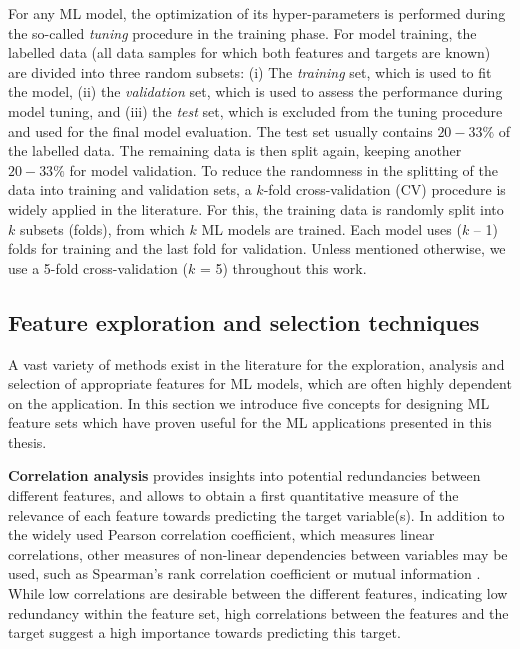 For any ML model, the optimization of its hyper-parameters is performed during the so-called \textit{tuning} procedure in the training phase. For model training, the labelled data (all data samples for which both features and targets are known) are divided into three random subsets: 
(i) The \textit{training} set, which is used to fit the model, (ii) the \textit{validation} set, which is used to assess the performance during model tuning, and (iii) the \textit{test} set, which is excluded from the tuning procedure and used for the final model evaluation.
The test set usually contains $20 - 33\%$ of the labelled data. The remaining data is then split again, keeping another $20 - 33\%$ for model validation.
To reduce the randomness in the splitting of the data into training and validation sets, a $k$-fold cross-validation (CV) procedure is widely applied in the literature. 
For this, the training data is randomly split into $k$ subsets (folds), from which $k$ ML models are trained. Each model uses ($k$ – 1) folds for training and the last fold for validation. 
Unless mentioned otherwise, we use a 5-fold cross-validation ($k$ = 5) throughout this work.
% 

\subsection{Feature exploration and selection techniques}
\label{ML_features}

A vast variety of methods exist in the literature for the exploration, analysis and selection of appropriate features for ML models, which are often highly dependent on the application. In this section we introduce five concepts for designing ML feature sets which have proven useful for the ML applications presented in this thesis.

\textbf{Correlation analysis} provides insights into potential redundancies between different features, and allows to obtain a first quantitative measure of the relevance of each feature towards predicting the target variable(s).
In addition to the widely used Pearson correlation coefficient, which measures linear correlations, other measures of non-linear dependencies between variables may be used, such as Spearman's rank correlation coefficient \cite{kokoska_crc_1999} or mutual information \cite{kozachenko_statistical_1987}. While low correlations are desirable between the different features, indicating low redundancy within the feature set, high correlations between the features and the target suggest a high importance towards predicting this target.

